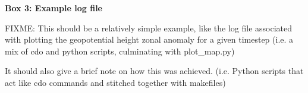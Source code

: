 \textbf{Box 3: Example log file}

FIXME: This should be a relatively simple example, like the log file associated with plotting the geopotential height zonal anomaly for a given timestep (i.e. a mix of cdo and python scripts, culminating with plot_map.py)

It should also give a brief note on how this was achieved. (i.e. Python scripts that act like cdo commands and stitched together with makefiles)